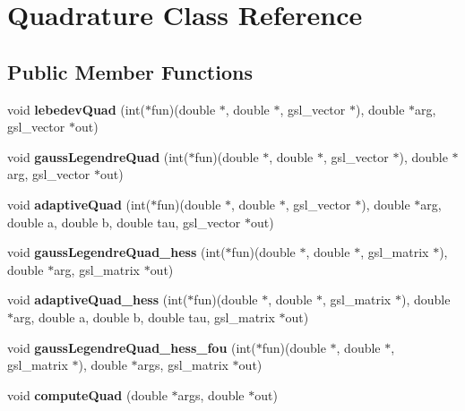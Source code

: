 \hypertarget{class_quadrature}{
\section{Quadrature Class Reference}
\label{class_quadrature}
}
\subsection*{Public Member Functions}
\begin{DoxyCompactItemize}
\item 
\hypertarget{class_quadrature_aa59680d28575ce357071e12919ed444e}{
void {\bfseries lebedevQuad} (int($\ast$fun)(double $\ast$, double $\ast$, gsl\_\-vector $\ast$), double $\ast$arg, gsl\_\-vector $\ast$out)}
\label{class_quadrature_aa59680d28575ce357071e12919ed444e}

\item 
\hypertarget{class_quadrature_a200f644a4d5eb7417f99bd6119054f6b}{
void {\bfseries gaussLegendreQuad} (int($\ast$fun)(double $\ast$, double $\ast$, gsl\_\-vector $\ast$), double $\ast$arg, gsl\_\-vector $\ast$out)}
\label{class_quadrature_a200f644a4d5eb7417f99bd6119054f6b}

\item 
\hypertarget{class_quadrature_a7f6042f441c6cf53426a5777d8881317}{
void {\bfseries adaptiveQuad} (int($\ast$fun)(double $\ast$, double $\ast$, gsl\_\-vector $\ast$), double $\ast$arg, double a, double b, double tau, gsl\_\-vector $\ast$out)}
\label{class_quadrature_a7f6042f441c6cf53426a5777d8881317}

\item 
\hypertarget{class_quadrature_abaf7c44bab749552b1fc8254efce7cca}{
void {\bfseries gaussLegendreQuad\_\-hess} (int($\ast$fun)(double $\ast$, double $\ast$, gsl\_\-matrix $\ast$), double $\ast$arg, gsl\_\-matrix $\ast$out)}
\label{class_quadrature_abaf7c44bab749552b1fc8254efce7cca}

\item 
\hypertarget{class_quadrature_ab8d3a8a63838eb7d04e6594c7722048c}{
void {\bfseries adaptiveQuad\_\-hess} (int($\ast$fun)(double $\ast$, double $\ast$, gsl\_\-matrix $\ast$), double $\ast$arg, double a, double b, double tau, gsl\_\-matrix $\ast$out)}
\label{class_quadrature_ab8d3a8a63838eb7d04e6594c7722048c}

\item 
\hypertarget{class_quadrature_a389a2bf41ad21b36309b3c8c61bf3400}{
void {\bfseries gaussLegendreQuad\_\-hess\_\-fou} (int($\ast$fun)(double $\ast$, double $\ast$, gsl\_\-matrix $\ast$), double $\ast$args, gsl\_\-matrix $\ast$out)}
\label{class_quadrature_a389a2bf41ad21b36309b3c8c61bf3400}

\item 
\hypertarget{class_quadrature_a910defe8755de964695103637a0c9ddd}{
void {\bfseries computeQuad} (double $\ast$args, double $\ast$out)}
\label{class_quadrature_a910defe8755de964695103637a0c9ddd}

\end{DoxyCompactItemize}
